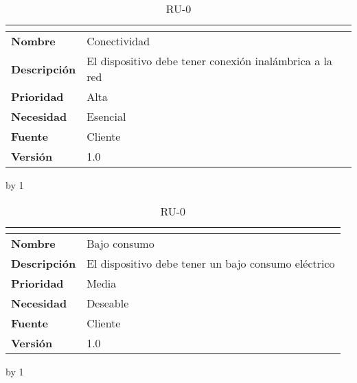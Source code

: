 \begin{table}[H]
	\caption{RU-0\number\ru}
	\begin{tabular}{|l|l|}
		\hline
		\multicolumn{2}{|c|}{\cellcolor[HTML]{BFBFBF}{\color[HTML]{000000} \textbf{RU-0\number\ru}}} \\ \hline
		\textbf{Nombre}      & Conectividad                                            \\ \hline
		\textbf{Descripción} & El dispositivo debe tener conexión inalámbrica a la red \\ \hline
		\textbf{Prioridad}   & Alta                                                    \\ \hline
		\textbf{Necesidad}   & Esencial                                                \\ \hline
		\textbf{Fuente}      & Cliente                                                 \\ \hline
		\textbf{Versión}     & 1.0                                                     \\ \hline
	\end{tabular}
\end{table}
\advance\ru by 1
\begin{table}[H]
	\caption{RU-0\number\ru}
	\begin{tabular}{|l|l|}
		\hline
		\multicolumn{2}{|c|}{\cellcolor[HTML]{BFBFBF}{\color[HTML]{000000} \textbf{RU-0\number\ru}}} \\ \hline
		\textbf{Nombre}      & Bajo consumo                                        \\ \hline
		\textbf{Descripción} & El dispositivo debe tener un bajo consumo eléctrico \\ \hline
		\textbf{Prioridad}   & Media                                               \\ \hline
		\textbf{Necesidad}   & Deseable                                            \\ \hline
		\textbf{Fuente}      & Cliente                                             \\ \hline
		\textbf{Versión}     & 1.0                                                 \\ \hline
	\end{tabular}
\end{table}
\advance\ru by 1
